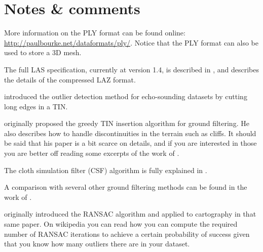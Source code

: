 %
%
%
%
%


%
\section{Notes \& comments}
More information on the PLY format can be found online: \url{http://paulbourke.net/dataformats/ply/}. 
Notice that the PLY format can also be used to store a 3D mesh.

The full LAS specification, currently at version 1.4, is described in \citet{LAS13}, and \citet{Isenburg13} describes the details of the compressed LAZ format.

\citet{Arge10} introduced the outlier detection method for echo-sounding datasets by cutting long edges in a TIN\@.

\citet{axelsson2000generation} originally proposed the greedy TIN insertion algorithm for ground filtering.
He also describes how to handle discontinuities in the terrain such as cliffs.
It should be said that his paper is a bit scarce on details, and if you are interested in those you are better off reading some excerpts of the work of \citet{Lin14}. 

The cloth simulation filter (CSF) algorithm is fully explained in \citet{Zhang16}.

A comparison with several other ground filtering methods can be found in the work of \citet{Meng10}.

\citet{Fischler81} originally introduced the RANSAC algorithm and applied to cartography in that same paper. On wikipedia you can read how you can compute the required number of RANSAC iterations to achieve a certain probability of success given that you know how many outliers there are in your dataset.

